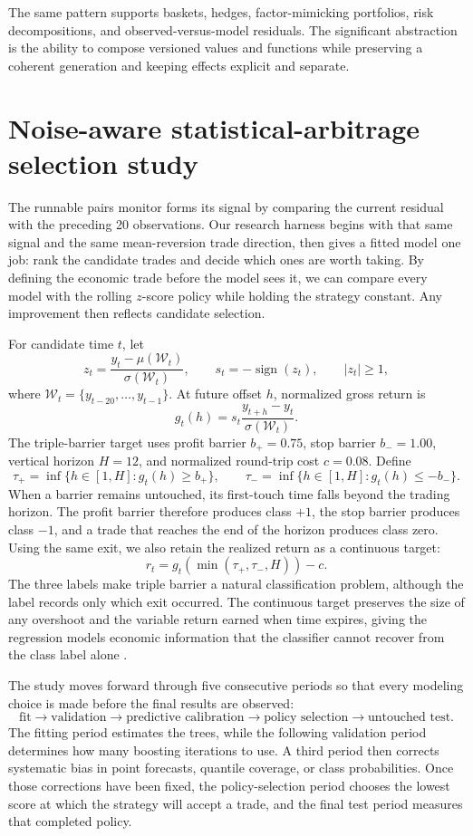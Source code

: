 \documentclass{strategynet-journal}
\begin{document}
The same pattern supports baskets, hedges, factor-mimicking portfolios, risk
decompositions, and observed-versus-model residuals.  The significant
abstraction is the ability to compose versioned values and functions while
preserving a coherent generation and keeping effects explicit and separate.

\section{Noise-aware statistical-arbitrage selection study}

The runnable pairs monitor forms its signal by comparing the current residual
with the preceding 20 observations.  Our research harness begins with that same
signal and the same mean-reversion trade direction, then gives a fitted model
one job: rank the candidate trades and decide which ones are worth taking.  By
defining the economic trade before the model sees it, we can compare every
model with the rolling \(z\)-score policy while holding the strategy constant.
Any improvement then reflects candidate selection.

For candidate time \(t\), let
\[
  z_t=\frac{y_t-\mu(\mathcal W_t)}{\sigma(\mathcal W_t)},
  \qquad s_t=-\operatorname{sign}(z_t),
  \qquad |z_t|\ge 1,
\]
where \(\mathcal W_t=\{y_{t-20},\ldots,y_{t-1}\}\).  At future offset \(h\),
normalized gross return is
\[
  g_t(h)=s_t\frac{y_{t+h}-y_t}{\sigma(\mathcal W_t)}.
\]
The triple-barrier target uses profit barrier \(b_+=0.75\), stop barrier
\(b_-=1.00\), vertical horizon \(H=12\), and normalized round-trip cost
\(c=0.08\).  Define
\[
  \tau_+=\inf\{h\in[1,H]:g_t(h)\ge b_+\},\qquad
  \tau_-=\inf\{h\in[1,H]:g_t(h)\le-b_-\}.
\]
When a barrier remains untouched, its first-touch time falls beyond the trading
horizon.  The profit barrier therefore produces class \(+1\), the stop barrier
produces class \(-1\), and a trade that reaches the end of the horizon produces
class zero.  Using the same exit, we also retain the realized return as a
continuous target:
\[
  r_t=g_t\!\left(\min(\tau_+,\tau_-,H)\right)-c.
\]
The three labels make triple barrier a natural classification problem, although
the label records only which exit occurred.  The continuous target preserves
the size of any overshoot and the variable return earned when time expires,
giving the regression models economic information that the classifier cannot
recover from the class label alone \cite{lopezdeprado}.

The study moves forward through five consecutive periods so that every modeling
choice is made before the final results are observed:
\[
\text{fit}\rightarrow\text{validation}\rightarrow
\text{predictive calibration}\rightarrow\text{policy selection}
\rightarrow\text{untouched test}.
\]
The fitting period estimates the trees, while the following validation period
determines how many boosting iterations to use.  A third period then corrects
systematic bias in point forecasts, quantile coverage, or class probabilities.
Once those corrections have been fixed, the policy-selection period chooses
the lowest score at which the strategy will accept a trade, and the final test
period measures that completed policy.
\end{document}
